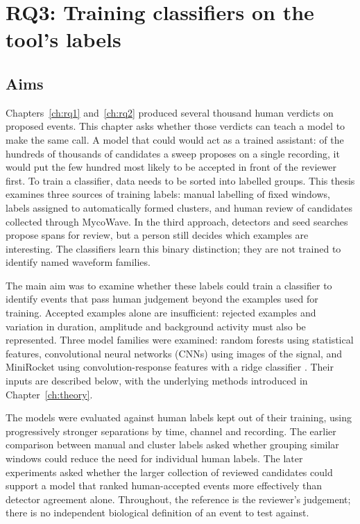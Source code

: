 \chapter{RQ3: Training classifiers on the tool's labels}
\label{ch:rq3}


\section{Aims}

Chapters~\ref{ch:rq1} and~\ref{ch:rq2} produced several thousand human verdicts on proposed events. This chapter asks whether those verdicts can teach a model to make the same call. A model that could would act as a trained assistant: of the hundreds of thousands of candidates a sweep proposes on a single recording, it would put the few hundred most likely to be accepted in front of the reviewer first. To train a classifier, data needs to be sorted into labelled groups. This thesis examines three sources of training labels: manual labelling of fixed windows, labels assigned to automatically formed clusters, and human review of candidates collected through MycoWave. In the third approach, detectors and seed searches propose spans for review, but a person still decides which examples are interesting. The classifiers learn this binary distinction; they are not trained to identify named waveform families.

The main aim was to examine whether these labels could train a classifier to identify events that pass human judgement beyond the examples used for training. Accepted examples alone are insufficient: rejected examples and variation in duration, amplitude and background activity must also be represented. Three model families were examined: random forests using statistical features, convolutional neural networks (CNNs) using images of the signal, and MiniRocket using convolution-response features with a ridge classifier \cite{dempster2021minirocket}. Their inputs are described below, with the underlying methods introduced in Chapter~\ref{ch:theory}.

The models were evaluated against human labels kept out of their training, using progressively stronger separations by time, channel and recording. The earlier comparison between manual and cluster labels asked whether grouping similar windows could reduce the need for individual human labels. The later experiments asked whether the larger collection of reviewed candidates could support a model that ranked human-accepted events more effectively than detector agreement alone. Throughout, the reference is the reviewer's judgement; there is no independent biological definition of an event to test against.

